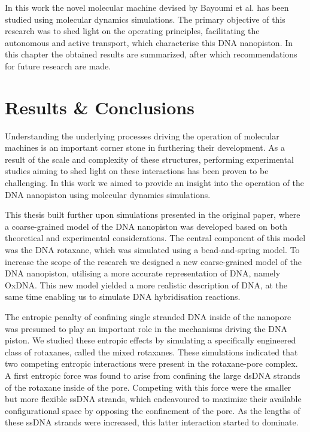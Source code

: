 \noindent In this work the novel molecular machine devised by Bayoumi et
al.\cite{Bayoumi21} has been
studied using
molecular dynamics simulations. The primary objective of this research was to shed
light on the operating principles, facilitating the autonomous and active transport,
which
characterise this DNA nanopiston. In this chapter the obtained results are summarized,
after which recommendations for future research are made.

\section{Results \& Conclusions}

Understanding the underlying processes driving the operation of molecular machines is an
important corner stone in furthering their development. As a result of the scale and
complexity of these structures, performing  experimental studies aiming to shed light on
these interactions has been proven to be challenging. In this work we aimed to provide an
insight into the operation of the
DNA nanopiston using molecular dynamics simulations.

This thesis built further upon simulations presented in the original paper, where a
coarse-grained model of the DNA nanopiston was developed based on both theoretical and
experimental considerations. The central component of this model was the DNA rotaxane,
which was simulated using a bead-and-spring model. To increase the scope of the research
we designed a new coarse-grained model of the DNA nanopiston, utilising a more accurate
representation of DNA, namely OxDNA. This new model yielded a more realistic description
of DNA, at the same time enabling us to simulate DNA hybridisation reactions.

The entropic penalty of confining single stranded DNA inside of the nanopore was presumed
to play an important role in the mechanisms driving the DNA piston. We studied these
entropic effects by simulating a specifically engineered class of rotaxanes, called the
mixed rotaxanes. These simulations indicated that two competing entropic
interactions were present in the rotaxane-pore complex. A first entropic force was found
to
arise from confining the large dsDNA strands of the rotaxane inside of the pore.
Competing with this force were the smaller but more flexible ssDNA strands, which
endeavoured to maximize their available configurational space by opposing the confinement
of the pore. As the lengths of these ssDNA strands were increased, this latter
interaction started to dominate.

